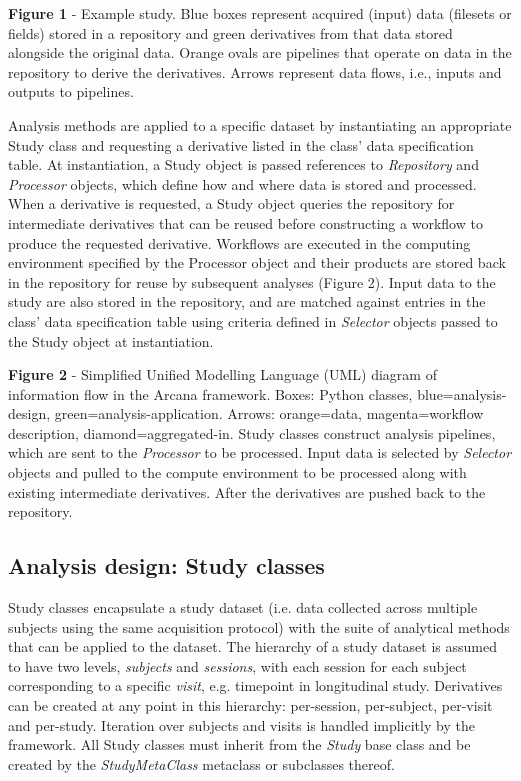 
\textbf{Figure 1} - Example study. Blue boxes represent acquired (input)
data (filesets or fields) stored in a repository and green derivatives
from that data stored alongside the original data. Orange ovals are
pipelines that operate on data in the repository to derive the
derivatives. Arrows represent data flows, i.e., inputs and outputs to
pipelines.

Analysis methods are applied to a specific dataset by instantiating an
appropriate Study class and requesting a derivative listed in the class'
data specification table. At instantiation, a Study object is passed
references to \emph{Repository} and \emph{Processor} objects, which
define how and where data is stored and processed. When a derivative is
requested, a Study object queries the repository for intermediate
derivatives that can be reused before constructing a workflow to produce
the requested derivative. Workflows are executed in the computing
environment specified by the Processor object and their products are
stored back in the repository for reuse by subsequent analyses (Figure
2). Input data to the study are also stored in the repository, and are
matched against entries in the class' data specification table using
criteria defined in \emph{Selector} objects passed to the Study object
at instantiation.


\textbf{Figure 2} - Simplified Unified Modelling Language (UML) diagram
of information flow in the Arcana framework. Boxes: Python classes,
blue=analysis-design, green=analysis-application. Arrows: orange=data,
magenta=workflow description, diamond=aggregated-in. Study classes
construct analysis pipelines, which are sent to the \emph{Processor} to
be processed. Input data is selected by \emph{Selector} objects and
pulled to the compute environment to be processed along with existing
intermediate derivatives. After the derivatives are pushed back to the
repository.

\subsection{Analysis design: Study classes}
\label{analysis-design-study-classes}

Study classes encapsulate a study dataset (i.e. data collected across
multiple subjects using the same acquisition protocol) with the suite of
analytical methods that can be applied to the dataset. The hierarchy of
a study dataset is assumed to have two levels, \emph{subjects} and
\emph{sessions}, with each session for each subject corresponding to a
specific \emph{visit}, e.g. timepoint in longitudinal study. Derivatives
can be created at any point in this hierarchy: per-session, per-subject,
per-visit and per-study. Iteration over subjects and visits is handled
implicitly by the framework. All Study classes must inherit from the
\emph{Study} base class and be created by the \emph{StudyMetaClass}
metaclass or subclasses thereof.

